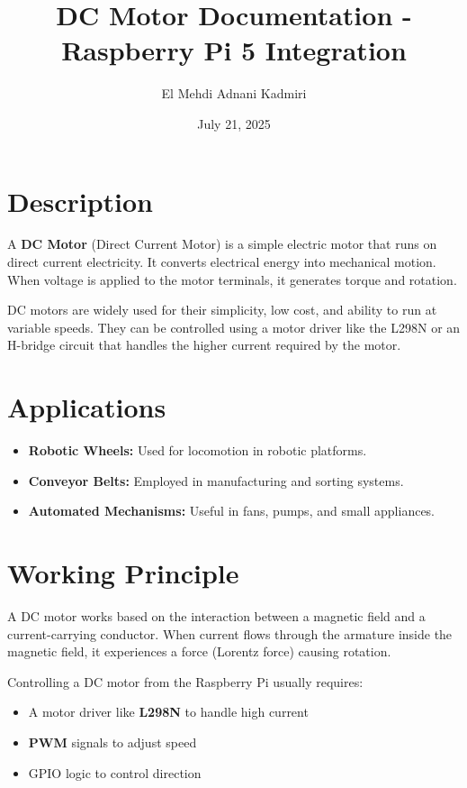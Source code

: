 \documentclass{article}
\title{DC Motor Documentation - Raspberry Pi 5 Integration}
\author{El Mehdi Adnani Kadmiri}
\date{July 21, 2025}
\begin{document}
	
	\maketitle
	
	\section{Description}
	A \textbf{DC Motor} (Direct Current Motor) is a simple electric motor that runs on direct current electricity. It converts electrical energy into mechanical motion. When voltage is applied to the motor terminals, it generates torque and rotation.
	
	DC motors are widely used for their simplicity, low cost, and ability to run at variable speeds. They can be controlled using a motor driver like the L298N or an H-bridge circuit that handles the higher current required by the motor.
	
	\section{Applications}
	\begin{itemize}
		\item \textbf{Robotic Wheels:} Used for locomotion in robotic platforms.
		\item \textbf{Conveyor Belts:} Employed in manufacturing and sorting systems.
		\item \textbf{Automated Mechanisms:} Useful in fans, pumps, and small appliances.
	\end{itemize}
	
	\section{Working Principle}
	A DC motor works based on the interaction between a magnetic field and a current-carrying conductor. When current flows through the armature inside the magnetic field, it experiences a force (Lorentz force) causing rotation.
	
	Controlling a DC motor from the Raspberry Pi usually requires:
	\begin{itemize}
		\item A motor driver like \textbf{L298N} to handle high current
		\item \textbf{PWM} signals to adjust speed
		\item GPIO logic to control direction
	\end{itemize}
	
\end{document}
